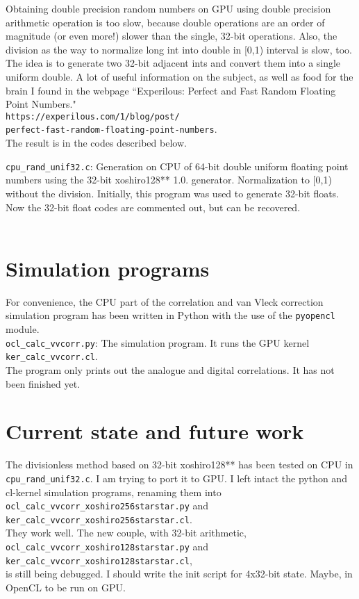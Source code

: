 \documentclass[preprint2]{aastex}
\begin{document}
Obtaining double precision random numbers on GPU using double precision arithmetic operation is too slow, because double operations are an order of magnitude (or even more!) slower than the single, 32-bit operations. Also, the division as the way to normalize long int into double in [0,1) interval is slow, too. The idea is to generate two 32-bit adjacent ints and convert them into a single uniform double. A lot of useful information on the subject, as well as food for the brain I found in the webpage ``Experilous: Perfect and Fast Random Floating Point Numbers." \\
\verb|https://experilous.com/1/blog/post/| \\
\verb|perfect-fast-random-floating-point-numbers|. \\
The result is in the codes described below.

\verb|cpu_rand_unif32.c|: Generation on CPU of 64-bit double uniform floating point numbers using the 32-bit xoshiro128** 1.0. generator. Normalization to [0,1) without the division. Initially, this program was used to generate 32-bit floats. Now the 32-bit float codes are commented out, but can be recovered.\\\

\section{Simulation programs}\label{demo}

For convenience, the CPU part of the correlation and van Vleck correction simulation program has been written in Python with the use of the \verb|pyopencl| module. \\

\verb|ocl_calc_vvcorr.py|: The simulation program. It runs the GPU kernel  \\
\verb|ker_calc_vvcorr.cl|. \\

The program only prints out the analogue and digital correlations. It has not been finished yet. 


\section{Current state and future work}\label{future}

The divisionless method based on 32-bit xoshiro128** has been tested on CPU in 
\verb|cpu_rand_unif32.c|. I am trying to port it to GPU. I left intact the python and cl-kernel simulation programs, renaming them into \\
\verb|ocl_calc_vvcorr_xoshiro256starstar.py| and \\
\verb|ker_calc_vvcorr_xoshiro256starstar.cl|. \\
They work well. The new couple, with 32-bit arithmetic, \\
\verb|ocl_calc_vvcorr_xoshiro128starstar.py| and \\
\verb|ker_calc_vvcorr_xoshiro128starstar.cl|, \\
is still being debugged. I should write the init script for 4x32-bit state. Maybe, in OpenCL to be run on GPU.
\end{document}

